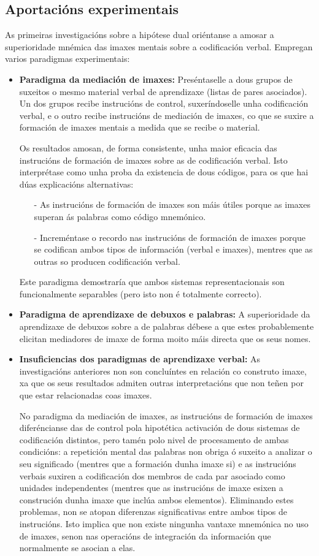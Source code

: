 \documentclass[a4paper,11pt]{article}
\begin{document}
\subsection{Aportacións experimentais}
As primeiras investigacións sobre a hipótese dual oriéntanse a amosar a superioridade mnémica das imaxes mentais sobre a codificación verbal. Empregan varios paradigmas experimentais:
\begin{itemize}
	\item \textbf{Paradigma da mediación de imaxes:} Preséntaselle a dous grupos de suxeitos o mesmo 
	material verbal de aprendizaxe (listas de pares asociados). Un dos grupos recibe instrucións de 
	control, suxeríndoselle unha codificación verbal, e o outro recibe instrucións de mediación de 
	imaxes, co que se suxire a formación de imaxes mentais a medida que se recibe o material. 
	
	Os resultados amosan, de forma consistente, unha maior eficacia das instrucións de formación de 
	imaxes sobre as de codificación verbal. Isto interprétase como unha proba da existencia de dous 
	códigos, para os que hai dúas explicacións alternativas:
	\begin{itemize}
		\item[-] As instrucións de formación de imaxes son máis útiles porque as imaxes superan ás 
		palabras como código mnemónico.
		\item[-] Increméntase o recordo nas instrucións de formación de imaxes porque se codifican 
		ambos tipos de información (verbal e imaxes), mentres que as outras so producen codificación 
		verbal.
	\end{itemize}
	
	Este paradigma demostraría que ambos sistemas representacionais son funcionalmente separables 
	(pero isto non é totalmente correcto).
	\item \textbf{Paradigma de aprendizaxe de debuxos e palabras:} A superioridade da aprendizaxe de 
	debuxos sobre a de palabras débese a que estes probablemente elicitan mediadores de imaxe de 
	forma moito máis directa que os seus nomes.
	\item \textbf{Insuficiencias dos paradigmas de aprendizaxe verbal:} As investigacións anteriores 
	non son concluíntes en relación co construto imaxe, xa que os seus resultados admiten outras 
	interpretacións que non teñen por que estar relacionadas coas imaxes. 
	
	No paradigma da mediación de imaxes, as instrucións de formación de imaxes diferéncianse das de 
	control pola hipotética activación de dous sistemas de codificación distintos, pero tamén polo 
	nivel de procesamento de ambas condicións: a repetición mental das palabras non obriga ó suxeito 
	a analizar o seu significado (mentres que a formación dunha imaxe si) e as instrucións verbais 
	suxiren a codificación dos membros de cada par asociado como unidades independentes (mentres que 
	as instrucións de imaxe esixen a construción dunha imaxe que inclúa ambos elementos). Eliminando 
	estes problemas, non se atopan diferenzas significativas entre ambos tipos de instrucións. Isto 
	implica que non existe ningunha vantaxe mnemónica no uso de imaxes, senon nas operacións de 
	integración da información que normalmente se asocian a elas. 
	

\end{itemize}
\end{document}
